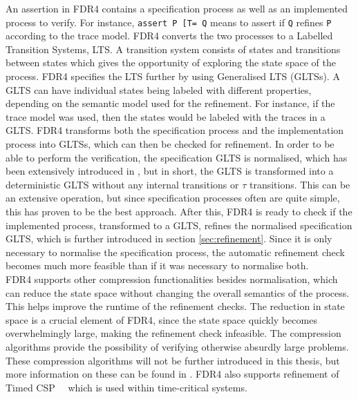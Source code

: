An assertion in FDR4 contains a specification process as well as an implemented process to verify. For instance, \texttt{assert P [T= Q} means to assert if \texttt{Q} refines \texttt{P} according to the trace model.
FDR4 converts the two processes to a Labelled Transition Systems, LTS. A transition system consists of states and transitions between states which gives the opportunity of exploring the state space of the process.
FDR4 specifies the LTS further by using Generalised LTS (GLTSs). A GLTS can have individual states being labeled with different properties, depending on the semantic model used for the refinement. For instance, if the trace model was used, then the states would be labeled with the traces in a GLTS.
FDR4 transforms both the specification process and the implementation process into GLTSs, which can then be checked for refinement. In order to be able to perform the verification, the specification GLTS is normalised, which has been extensively introduced in \cite{Roscoe1997}, but in short, the GLTS is transformed into a deterministic GLTS without any internal transitions or $\tau$ transitions. This can be an extensive operation, but since specification processes often are quite simple, this has proven to be the best approach.
After this, FDR4 is ready to check if the implemented process, transformed to a GLTS, refines the normalised specification GLTS, which is further introduced in section \ref{sec:refinement}. Since it is only necessary to normalise the specification process, the automatic refinement check becomes much more feasible than if it was necessary to normalise both. \\

FDR4 supports other compression functionalities besides normalisation, which can reduce the state space without changing the overall semantics of the process. This helps improve the runtime of the refinement checks. The reduction in state space is a crucial element of FDR4, since the state space quickly becomes overwhelmingly large, making the refinement check infeasible. The compression algorithms provide the possibility of verifying otherwise absurdly large problems.
These compression algorithms will not be further introduced in this thesis, but more information on these can be found in \cite{Roscoe2010}.
FDR4 also supports refinement of Timed CSP~\cite{REED1988249}~\cite{armstrong2014model} which is used within time-critical systems.
